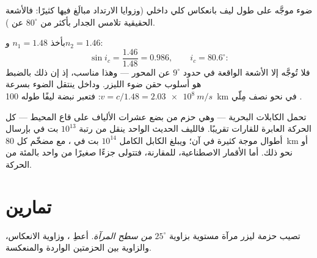 \begin{omfigure}

{\small ضوء موجَّه على طول  ليف بانعكاس كلي
داخلي (وزوايا الارتداد مبالَغ فيها كثيرًا: فالأشعة الحقيقية تلامس الجدار
بأكثر من $80^\circ$ عن ).}
\end{omfigure}

\begin{example}\label{ex:g10:refraction:fibernumbers}
بأخذ $n_1 = 1.48$ و$n_2 = 1.46$:
\[
\sin i_c = \frac{1.46}{1.48} = 0.986,
\qquad i_c = 80.6^\circ :
\]
فلا تُوجَّه إلا الأشعة الواقعة في حدود $9^\circ$ عن المحور --- وهذا
مناسب، إذ إن ذلك بالضبط هو أسلوب حقن ضوء الليزر. وداخل
 ينتقل الضوء بسرعة $v = c/1.48 = \qty{2.03e8}{m/s}$: فتعبر نبضة
ليفًا طوله \qty{100}{km} في نحو نصف مِلّي .
\end{example}

\begin{remark}\label{rem:g10:refraction:datarates}
تحمل الكابلات البحرية --- وهي حزم من بضع عشرات الألياف على قاع المحيط ---
كل الحركة العابرة للقارات تقريبًا. فالليف الحديث الواحد
ينقل من رتبة $10^{13}$ بت في  بإرسال أطوال موجة
كثيرة في آن؛ ويبلغ الكابل الكامل $10^{14}$ بت في ،
مع مضخّم كل \qty{80}{km} أو نحو ذلك. أما الأقمار الاصطناعية، للمقارنة،
فتتولى جزءًا صغيرًا من واحد بالمئة من الحركة.
\end{remark}

\section{تمارين}

\begin{exercise}[$\star$]\label{exo:g10:refraction:1}
تصيب حزمة ليزر مرآة مستوية بزاوية $25^\circ$ \emph{من سطح
المرآة}. أعطِ ، وزاوية الانعكاس، والزاوية
بين الحزمتين الواردة والمنعكسة.
\end{exercise}


